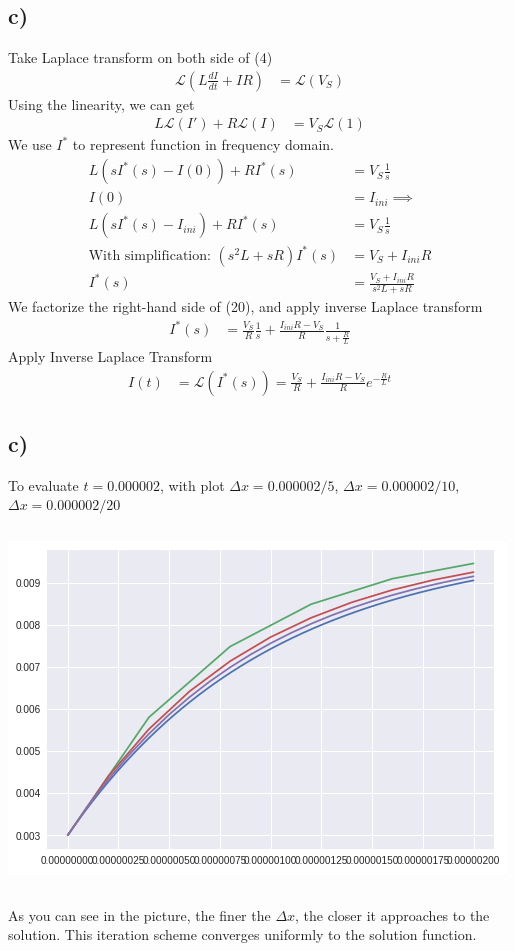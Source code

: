 \documentclass{article}
\newcommand{\Lcvy}{\mathcal{L}}
\begin{document}
\subsection*{c)}
Take Laplace transform on both side of (4)
\begin{align}
    \Lcvy(L \frac{dI}{dt} + IR) &= \Lcvy(V_{S})
\end{align}
Using the linearity, we can get
\begin{align}
    L \Lcvy(I') + R \Lcvy(I) &= V_{S} \Lcvy(1)
\end{align}
We use $I^*$ to represent function in frequency domain.
\begin{align}
    L(sI^*(s) - I(0)) + RI^*(s) &= V_{S} \frac{1}{s} \\
    I(0) &= I_{ini} \implies \\
    L(sI^*(s) - I_{ini}) + RI^*(s) &= V_{S} \frac{1}{s} \\
    \text{With simplification: }
    (s^2 L + sR) I^*(s) &= V_{S} + I_{ini} R \\
    I^*(s) &= \frac{V_{S} + I_{ini} R}{s^2 L + s R}
\end{align}
We factorize the right-hand side of (20), and apply inverse Laplace transform
\begin{align}
    I^*(s) &= \frac{V_{S}}{R} \frac{1}{s} + \frac{I_{ini} R - V_{S}}{R} \frac{1}{s + \frac{R}{L}}
\end{align}
Apply Inverse Laplace Transform
\begin{align}
    I(t) &= \Lcvy(I^*(s)) = \frac{V_{S}}{R} + \frac{I_{ini} R - V_{S}}{R} e^{-\frac{R}{L} t}
\end{align}
\subsection*{c)}
To evaluate $ t = 0.000002$, with plot $\Delta x = 0.000002 / 5 $, $\Delta x = 0.000002 / 10 $,
$\Delta x = 0.000002 / 20 $
\inputminted{Python}{plot.py}
\includegraphics{plot.png}
\inputminted{Python}{plot.dt}
As you can see in the picture, the finer the $\Delta x$, the closer
it approaches to the solution. This iteration scheme converges uniformly to the solution function.
\end{document}
